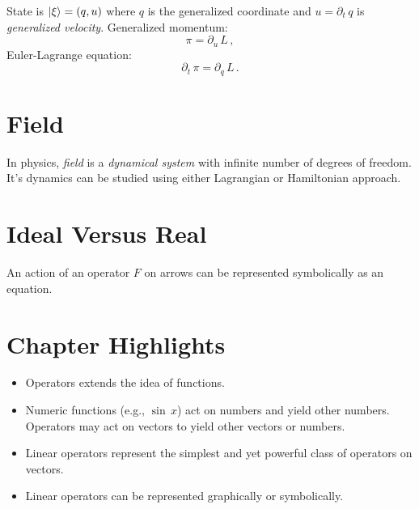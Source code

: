 State is $|{\xi}\rangle=(q, u)$ where $q$ is the generalized coordinate and $u=\partial_t\, q$ is \emph{generalized velocity}.
Generalized momentum:
\[
\pi = \partial_u\,L\,,
\]
Euler-Lagrange equation:
\[
\partial_t\,\pi = \partial_q\,L\,.
\]

\section{Field}\label{sec:Field}
In physics, \emph{field} is a \emph{dynamical system} with infinite number of degrees of freedom. It's dynamics can be studied using either Lagrangian or Hamiltonian approach.

\section{Ideal Versus Real}\label{sec:IdealVsReal}
An action of an operator $F$ on arrows can be represented symbolically
as an equation.



\section*{Chapter Highlights}
{\chhc
  \it  
\begin{itemize}
\item Operators extends the idea of functions.
\item Numeric functions (e.g., $\sin\,x$) act on numbers and yield
  other numbers. Operators may act on vectors to yield other vectors
  or numbers.
\item Linear operators represent the simplest and yet powerful class
  of operators on vectors.
\item Linear operators can be represented graphically or symbolically.
\end{itemize}

}
